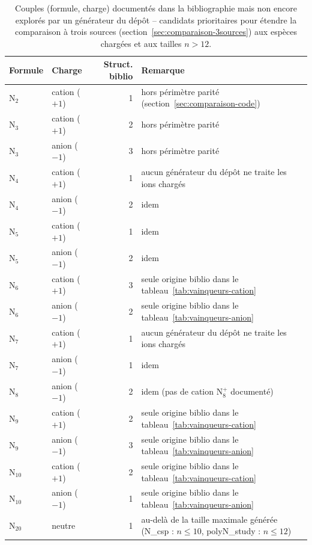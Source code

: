 \documentclass[11pt,a4paper]{article}
\begin{document}
\begin{table}[H]
\centering
\small
\begin{tabular}{llrp{6.5cm}}
\toprule
Formule & Charge & Struct. biblio & Remarque \\
\midrule
N$_2$    & cation ($+1$) & 1 & hors p\'erim\`etre parit\'e (section~\ref{sec:comparaison-code}) \\
N$_3$    & cation ($+1$) & 2 & hors p\'erim\`etre parit\'e \\
N$_3$    & anion ($-1$)  & 3 & hors p\'erim\`etre parit\'e \\
N$_4$    & cation ($+1$) & 1 & aucun g\'en\'erateur du d\'ep\^ot ne traite les ions charg\'es \\
N$_4$    & anion ($-1$)  & 2 & idem \\
N$_5$    & cation ($+1$) & 1 & idem \\
N$_5$    & anion ($-1$)  & 2 & idem \\
N$_6$    & cation ($+1$) & 3 & seule origine biblio dans le tableau~\ref{tab:vainqueurs-cation} \\
N$_6$    & anion ($-1$)  & 2 & seule origine biblio dans le tableau~\ref{tab:vainqueurs-anion} \\
N$_7$    & cation ($+1$) & 1 & aucun g\'en\'erateur du d\'ep\^ot ne traite les ions charg\'es \\
N$_7$    & anion ($-1$)  & 1 & idem \\
N$_8$    & anion ($-1$)  & 2 & idem (pas de cation N$_8^{+}$ document\'e) \\
N$_9$    & cation ($+1$) & 2 & seule origine biblio dans le tableau~\ref{tab:vainqueurs-cation} \\
N$_9$    & anion ($-1$)  & 3 & seule origine biblio dans le tableau~\ref{tab:vainqueurs-anion} \\
N$_{10}$ & cation ($+1$) & 2 & seule origine biblio dans le tableau~\ref{tab:vainqueurs-cation} \\
N$_{10}$ & anion ($-1$)  & 1 & seule origine biblio dans le tableau~\ref{tab:vainqueurs-anion} \\
N$_{20}$ & neutre        & 1 & au-del\`a de la taille maximale g\'en\'er\'ee (N\_csp : $n\leq10$, polyN\_study : $n\leq12$) \\
\bottomrule
\end{tabular}
\caption{Couples (formule, charge) document\'es dans la bibliographie mais
non encore explor\'es par un g\'en\'erateur du d\'ep\^ot -- candidats
prioritaires pour \'etendre la comparaison \`a trois sources
(section~\ref{sec:comparaison-3sources}) aux esp\`eces charg\'ees et aux
tailles $n>12$.}
\label{tab:composes-a-etudier}
\end{table}
\end{document}
